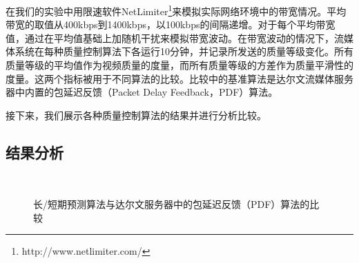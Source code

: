 在我们的实验中用限速软件NetLimiter\footnote{http://www.netlimiter.com/}来模拟实际网络环境中的带宽情况。平均带宽的取值从400kbps到1400kbps，以100kbps的间隔递增。对于每个平均带宽值，通过在平均值基础上加随机干扰来模拟带宽波动。在带宽波动的情况下，流媒体系统在每种质量控制算法下各运行10分钟，并记录所发送的质量等级变化。所有质量等级的平均值作为视频质量的度量，而所有质量等级的方差作为质量平滑性的度量。这两个指标被用于不同算法的比较。比较中的基准算法是达尔文流媒体服务器中内置的包延迟反馈（Packet Delay Feedback，PDF）算法。

接下来，我们展示各种质量控制算法的结果并进行分析比较。

\subsection{结果分析}

\begin{figure}[!ht]
	\centering
	\vspace{10pt}
	\vspace{10pt}
	\vspace{10pt}
	 \\
	\vspace{10pt}
	\vspace{10pt}
	\vspace{10pt}
	\caption{长/短期预测算法与达尔文服务器中的包延迟反馈（PDF）算法的比较}
	\label{fig:performance-all}
	\vspace{10pt}
\end{figure}

